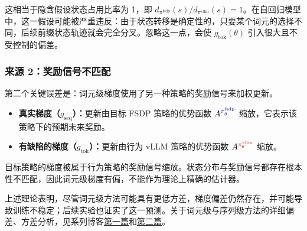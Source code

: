 
这相当于隐含假设状态占用比率为 1，即 $d_{\pi^{\mathrm{fsdp}}}(s)/d_{\pi^{\mathrm{vllm}}}(s)=1$。在自回归模型中，这一假设可能被严重违反：由于状态转移是确定性的，只要某个词元的选择不同，后续前缀状态轨迹就会完全分叉。忽略这一点，会使 $g_{\mathrm{tok}}(\theta)$ 引入很大且不受控制的偏差。



\hypertarget{src-27b211a5-58b7-802b-83de-e69ca2d3187e}{}
\subsubsection*{来源 2：奖励信号不匹配}



第二个关键误差是：词元级梯度使用了另一种策略的奖励信号来加权更新。



\begin{itemize}

\item \textbf{真实梯度（$g_{\mathrm{seq}}$）：}更新由目标 FSDP 策略的优势函数 $A^{\pif}$ 缩放，它表示该策略下的预期未来奖励。


\item \textbf{有缺陷的梯度（$g_{\mathrm{tok}}$）：}更新由行为 vLLM 策略的优势函数 $A^{\piv}$ 缩放。

\end{itemize}


目标策略的梯度被属于行为策略的奖励信号缩放。状态分布与奖励信号都存在根本性不匹配，因此词元级梯度有偏，不能作为理论上精确的估计器。




上述理论表明，尽管词元级方法可能具有更低方差，梯度偏差仍然存在，并可能导致训练不稳定；后续实验也证实了这一预测。关于词元级与序列级方法的详细偏差、方差分析，见系列博客\href{https://richardli.xyz/rl-collapse-1}{第一篇}和\href{https://richardli.xyz/rl-collapse-2}{第二篇}。


